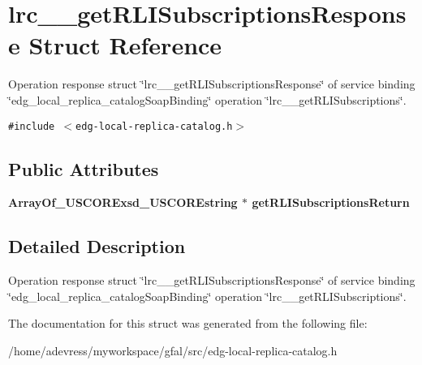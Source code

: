 \section{lrc\_\-\_\-get\-RLISubscriptions\-Response Struct Reference}
\label{structlrc____getRLISubscriptionsResponse}
Operation response struct \char`\"{}lrc\_\-\_\-get\-RLISubscriptions\-Response\char`\"{} of service binding \char`\"{}edg\_\-local\_\-replica\_\-catalog\-Soap\-Binding\char`\"{} operation \char`\"{}lrc\_\-\_\-get\-RLISubscriptions\char`\"{}.  


{\tt \#include $<$edg-local-replica-catalog.h$>$}

\subsection*{Public Attributes}
\begin{CompactItemize}
\item 
\bf{Array\-Of\_\-USCORExsd\_\-USCOREstring} $\ast$ \textbf{get\-RLISubscriptions\-Return}\label{structlrc____getRLISubscriptionsResponse_3590f593c3bd663509dc5765295ba81a}

\end{CompactItemize}


\subsection{Detailed Description}
Operation response struct \char`\"{}lrc\_\-\_\-get\-RLISubscriptions\-Response\char`\"{} of service binding \char`\"{}edg\_\-local\_\-replica\_\-catalog\-Soap\-Binding\char`\"{} operation \char`\"{}lrc\_\-\_\-get\-RLISubscriptions\char`\"{}. 



The documentation for this struct was generated from the following file:\begin{CompactItemize}
\item 
/home/adevress/myworkspace/gfal/src/edg-local-replica-catalog.h\end{CompactItemize}
